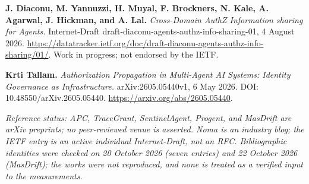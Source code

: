 \documentclass[
  10pt,
]{article}
\newcounter{none} %
\renewcommand{\_}{\origunderscore\allowbreak}
\begin{document}
\textbf{J. Diaconu, M. Yannuzzi, H. Muyal, F. Brockners, N. Kale, A.
Agarwal, J. Hickman, and A. Lal.} \emph{Cross-Domain AuthZ Information
sharing for Agents.} Internet-Draft
draft-diaconu-agents-authz-info-sharing-01, 4 August 2026.
\url{https://datatracker.ietf.org/doc/draft-diaconu-agents-authz-info-sharing/01/}.
Work in progress; not endorsed by the IETF.

\textbf{Krti Tallam.} \emph{Authorization Propagation in Multi-Agent AI
Systems: Identity Governance as Infrastructure.} arXiv:2605.05440v1, 6
May 2026. DOI: 10.48550/arXiv.2605.05440.
\url{https://arxiv.org/abs/2605.05440}.

\emph{Reference status: APC, TraceGrant, SentinelAgent, Progent, and
MasDrift are arXiv preprints; no peer-reviewed venue is asserted. Noma
is an industry blog; the IETF entry is an active individual
Internet-Draft, not an RFC. Bibliographic identities were checked on 20
October 2026 (seven entries) and 22 October 2026 (MasDrift); the works
were not reproduced, and none is treated as a verified input to the
measurements.}
\end{document}
